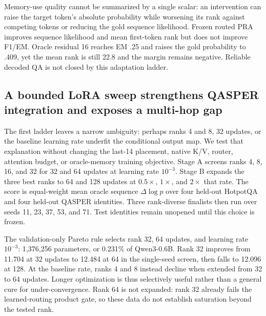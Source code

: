 \documentclass[11pt]{article}
\begin{document}
Memory-use quality cannot be summarized by a single scalar: an intervention can raise the target
token's absolute probability while worsening its rank against competing tokens or reducing the
gold sequence likelihood. Frozen routed PRA improves sequence likelihood and mean first-token
rank but does not improve F1/EM. Oracle residual 16 reaches EM .25 and raises the gold probability
to .409, yet the mean rank is still 22.8 and the margin remains negative. Reliable decoded QA is
not closed by this adaptation ladder.

\subsection{A bounded LoRA sweep strengthens QASPER integration and exposes a multi-hop gap}
\label{sec:overnight-lora}

The first ladder leaves a narrow ambiguity: perhaps ranks 4 and 8, 32 updates, or the baseline
learning rate underfit the conditional output map. We test that explanation without changing the
last-14 placement, native K/V, router, attention budget, or oracle-memory training objective.
Stage A screens ranks 4, 8, 16, and 32 for 32 and 64 updates at learning rate $10^{-3}$.
Stage B expands the three best ranks to 64 and 128 updates at $0.5\times$, $1\times$, and
$2\times$ that rate. The score is equal-weight mean oracle sequence $\Delta\log p$ over four
held-out HotpotQA and four held-out QASPER identities. Three rank-diverse finalists then run over
seeds 11, 23, 37, 53, and 71. Test identities remain unopened until this choice is frozen.

The validation-only Pareto rule selects rank 32, 64 updates, and learning rate $10^{-3}$:
1,376,256 parameters, or 0.231\% of Qwen3-0.6B. Rank 32 improves from 11.704 at 32 updates to
12.484 at 64 in the single-seed screen, then falls to 12.096 at 128. At the baseline rate,
ranks 4 and 8 instead decline when extended from 32 to 64 updates. Longer optimization is thus
selectively useful rather than a general cure for under-convergence. Rank 64 is not expanded:
rank 32 already fails the learned-routing product gate, so these data do not establish saturation
beyond the tested rank.
\end{document}
